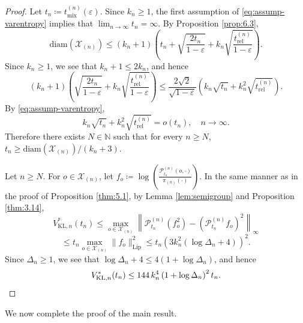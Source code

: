 \documentclass[a4paper, reqno, 11pt]{amsart}
\theoremstyle{definition}
\begin{document}
\begin{proof}
Let $t_n \coloneqq t_{\mathrm{mix}}^{(n)}(\varepsilon)$.
Since $k_n \ge 1$, the first assumption of \eqref{eq:assump-varentropy} implies that
$\lim_{n \to \infty} t_n = \infty$.
By Proposition \ref{prop:6.3},
\[ \mathrm{diam}(\mathcal{X}_{(n)}) \le (k_n+1)\left(t_n + \sqrt{\frac{2t_n}{1-\varepsilon}} + k_n \sqrt{\frac{t_{\mathrm{rel}}^{(n)}}{1-\varepsilon}}\right). \]
Since $k_n \ge 1$, we see that $k_n + 1 \le 2k_n$, and hence
\[ (k_n+1)\left(\sqrt{\frac{2t_n}{1-\varepsilon}} + k_n \sqrt{\frac{t_{\mathrm{rel}}^{(n)}}{1-\varepsilon}}\right) \le \frac{2\sqrt{2}}{\sqrt{1-\varepsilon}} \left(k_n\sqrt{t_n} + k_n^{2}\sqrt{t_{\mathrm{rel}}^{(n)}}\right). \]
By \eqref{eq:assump-varentropy},
\[ k_n \sqrt{t_n} + k_n^{2}\sqrt{t_{\mathrm{rel}}^{(n)}} = o(t_n), \quad n \to \infty. \]
Therefore there exists $N \in \mathbb{N}$ such that for every $n \ge N$, $t_n \ge \mathrm{diam}(\mathcal{X}_{(n)})/(k_n+3)$.

Let $n \ge N$.
For $o \in \mathcal{X}_{(n)}$, let
$f_o \coloneqq \log\left(\frac{\mathscr{P}_{t_n}^{(n)}(o,\cdot)}{\pi_{(n)}(\cdot)}\right)$.
In the same manner as in the proof of Proposition \ref{thm:5.1},
by Lemma \ref{lem:semigroup} and Proposition \ref{thm:3.14},
\[ V_{\mathrm{KL},n}^{*}(t_n) \le \max_{o \in \mathcal{X}_{(n)}} \left\|\mathscr{P}_{t_n}^{(n)}(f_o^2) - (\mathscr{P}_{t_n}^{(n)} f_o)^2\right\|_{\infty} \]
\[ \le t_n \max_{o \in \mathcal{X}_{(n)}} \|f_o\|_{\mathrm{Lip}}^{2} \le t_n \left(3k_n^{2}\left(\log \Delta_n + 4\right)\right)^{2}. \]
Since $\Delta_n \ge 1$, we see that $\log \Delta_n + 4 \le 4\left(1 + \log \Delta_n\right)$, and hence
\[ V_{\mathrm{KL},n}^{*}(t_n) \le 144\,k_n^{4}\left(1+\log \Delta_n\right)^{2} t_n. \qedhere \]
\end{proof}

We now complete the proof of the main result.
\end{document}
